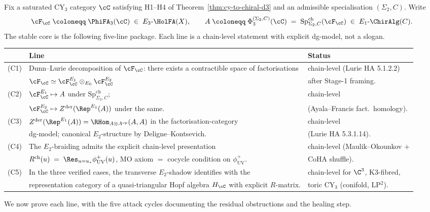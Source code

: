 Fix a saturated CY$_3$ category $\cC$ satisfying H1--H4 of
Theorem~\ref{thm:cy-to-chiral-d3} and an admissible specialisation
$(\Sigma_2, C)$.  Write
\[
 \cF_\cC \;\coloneqq\; \PhiFA_3(\cC) \;\in\; E_3\text{-}\HolFA(X),
 \qquad
 A \;\coloneqq\; \Phi_3^{(\Sigma_2, C)}(\cC)
 \;=\; \mathrm{Sp}^{\mathrm{ch}}_{\Sigma_2, C}(\cF_\cC)
 \;\in\; E_1\text{-}\ChirAlg(C).
\]
The stable core is the following five-line package.  Each line is a
chain-level statement with explicit dg-model, not a slogan.

\begin{center}
\renewcommand{\arraystretch}{1.3}
\begin{tabular}{rll}
 \toprule
 & \textbf{Line} & \textbf{Status} \\
 \midrule
 (C1) & Dunn--Lurie decomposition of $\cF_\cC$: there exists a
   contractible space of factorisations
 & chain-level (Lurie HA 5.1.2.2) \\
   & $\cF_\cC \simeq \cF^{E_1}_\cC \otimes_{E_0} \cF^{E_2}_\cC$ &
   after Stage-1 framing. \\
 (C2) & $\cF^{E_1}_\cC \mapsto A$ under
   $\mathrm{Sp}^{\mathrm{ch}}_{\Sigma_2, C}$; & chain-level \\
   & $\cF^{E_2}_\cC \mapsto Z^{\mathrm{der}}(\Rep^{E_1}(A))$
   under the same. & (Ayala--Francis fact.\ homology). \\
 (C3) & $Z^{\mathrm{der}}(\Rep^{E_1}(A))
   = \RHom_{A \otimes A^{\mathrm{op}}}(A, A)$ in the
   factorisation-category & chain-level \\
   & dg-model; canonical $E_2$-structure by Deligne--Kontsevich. &
   (Lurie HA 5.3.1.14). \\
 (C4) & The $E_2$-braiding admits the explicit chain-level presentation
 & chain-level (Maulik--Okounkov + \\
   & $R^{\mathrm{ch}}(u) \;=\; \Res_{u = u_\star}
   \phi^+_{\mathrm{UV}}(u)$, MO axiom $=$ cocycle condition on
   $\phi^+_{\mathrm{UV}}$. & CoHA shuffle). \\
 (C5) & In the three verified cases, the transverse $E_2$-shadow
   identifies with the &
   chain-level for $\C^3$, K3-fibred, \\
   & representation category of a quasi-triangular Hopf algebra
   $H_\cC$ with explicit $R$-matrix. & toric CY$_3$ (conifold, LP$^2$).\\
 \bottomrule
\end{tabular}
\end{center}

We now prove each line, with the five attack cycles documenting the
residual obstructions and the healing step.


